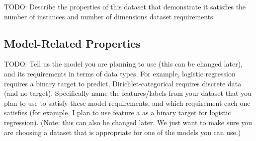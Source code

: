 \documentclass[12pt]{article}
\begin{document}
TODO: Describe the properties of this dataset that demonstrate it satisfies the number of instances and number of dimensions dataset requirements.

\subsection{Model-Related Properties}

TODO: Tell us the model you are planning to use (this can be changed later), and its requirements in terms of data types.  For example, logistic regression requires a binary target to predict, Dirichlet-categorical requires discrete data (and no target).  Specifically name the features/labels from your dataset that you plan to use to satisfy these model requirements, and which requirement each one satisfies (for example, I plan to use feature a as a binary target for logistic regression).  (Note: this can also be changed later.  We just want to make sure you are choosing a dataset that is appropriate for one of the models you can use.)
\end{document}
